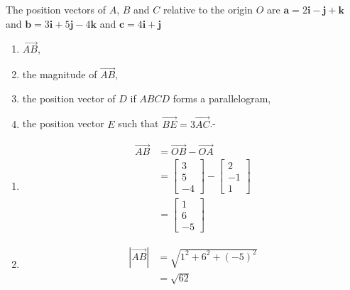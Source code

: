 \documentclass[11pt,a4paper]{book}
\begin{document}
\newpage

\begin{example}

The position vectors of $A$, $B$ and $C$ relative to the origin
$O$ are $\textbf{a}=2\textbf{i}-\textbf{j}+\textbf{k}$ and $\textbf{b}=3\textbf{i}+5\textbf{j}-4\textbf{k}$
and $\textbf{c}=4\textbf{i}+\textbf{j}$

\begin{enumerate}[label=(\alph*)]

\item  $\overrightarrow{AB}$,

\item  the magnitude of $\overrightarrow{AB}$,

\item  the position vector of $D$ if $ABCD$ forms a parallelogram,

\item  the position vector $E$ such that $\overrightarrow{BE}=3\overrightarrow{AC}$.-

\end{enumerate}

\Solution

\begin{enumerate}[label=(\alph*)]

\item
\begin{align*}
\overrightarrow{AB} & =\overrightarrow{OB}-\overrightarrow{OA}\\
 & =\begin{bmatrix}3\\
5\\
-4
\end{bmatrix}-\begin{bmatrix}2\\
-1\\
1
\end{bmatrix}\\
 & =\begin{bmatrix}1\\
6\\
-5
\end{bmatrix}
\end{align*}

\item
\begin{align*}
\left|\overrightarrow{AB}\right| & =\sqrt{1^{2}+6^{2}+\left(-5\right)^{2}}\\
 & =\sqrt{62}
\end{align*}


\end{enumerate}
\end{example}
\end{document}
